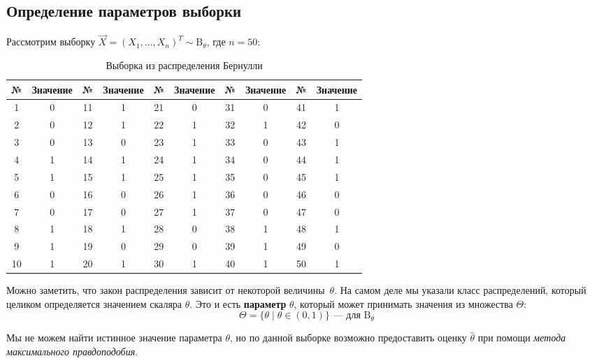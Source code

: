 \subsection{Определение параметров выборки}

Рассмотрим выборку \( \vec{X}=(X_1,\ldots,X_n)^T\sim \textrm{B}_\theta \), где \( n = 50 \):

\begin{table}[h!]
\centering
\begin{tabular}{|c|c||c|c||c|c||c|c||c|c|}
\hline
№ & Значение & № & Значение & № & Значение & № & Значение & № & Значение \\ \hline \hline
1  & 0 & 11 & 1 & 21 & 0 & 31 & 0 & 41 & 1 \\ \hline
2  & 0 & 12 & 1 & 22 & 1 & 32 & 1 & 42 & 0 \\ \hline
3  & 0 & 13 & 0 & 23 & 1 & 33 & 0 & 43 & 1 \\ \hline
4  & 1 & 14 & 1 & 24 & 1 & 34 & 0 & 44 & 1 \\ \hline
5  & 1 & 15 & 1 & 25 & 1 & 35 & 0 & 45 & 1 \\ \hline
6  & 0 & 16 & 0 & 26 & 1 & 36 & 0 & 46 & 0 \\ \hline
7  & 0 & 17 & 0 & 27 & 1 & 37 & 0 & 47 & 0 \\ \hline
8  & 1 & 18 & 1 & 28 & 0 & 38 & 1 & 48 & 1 \\ \hline
9  & 1 & 19 & 0 & 29 & 0 & 39 & 1 & 49 & 0 \\ \hline
10 & 1 & 20 & 1 & 30 & 1 & 40 & 1 & 50 & 1 \\ \hline
\end{tabular}
\caption{Выборка из распределения Бернулли}
\end{table}

Можно заметить, что закон распределения зависит от некоторой величины~\( \theta \). На самом деле мы указали класс распределений, который целиком определяется значением скаляра \( \theta \). Это и есть \textbf{параметр} \( \theta \), который может принимать значения из множества \( \Theta \):
\[
    \Theta=\{\theta\mid \theta\in(0,1)\}\text{ --- для }\textrm{B}_{\theta}
\]

Мы не можем найти истинное значение параметра \( \theta \), но по данной выборке возможно предоставить оценку \( \hat{\theta} \) при помощи \textit{метода максимального правдоподобия}.